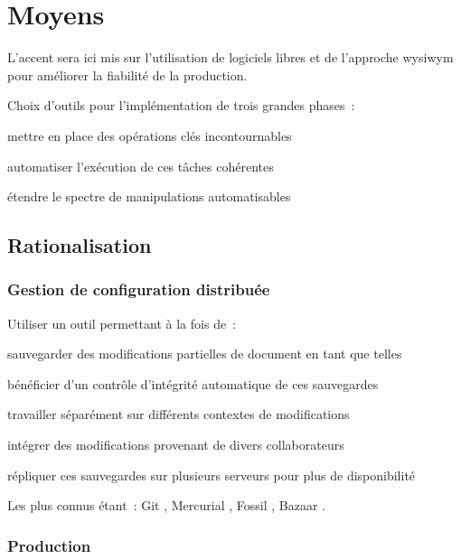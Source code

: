 \section{Moyens}

L’accent sera ici mis sur l’utilisation de logiciels libres
et de l’approche \gls{wysiwym} pour améliorer la fiabilité de la production.

Choix d’outils pour l’implémentation de trois grandes phases :

\begin{itmz}
\item{mettre en place des opérations clés incontournables}
\item{automatiser l’exécution de ces tâches cohérentes}
\item{étendre le spectre de manipulations automatisables}
\end{itmz}

\hr

\subsection{Rationalisation}

\subsubsection{Gestion de configuration distribuée}

Utiliser un outil permettant à la fois de :
\begin{itmz}
\item{sauvegarder des modifications partielles de document en tant que telles}
\item{bénéficier d’un contrôle d’intégrité automatique de ces sauvegardes}
\item{travailler séparément sur différents contextes de modifications}
\item{intégrer des modifications provenant de divers collaborateurs}
\item{répliquer ces sauvegardes sur plusieurs serveurs pour plus de disponibilité}
\end{itmz}
Les plus connus étant :
Git \cite{git}, Mercurial \cite{hg}, Fossil \cite{fossil}, Bazaar \cite{bazaar}.

\subsubsection{Production}

